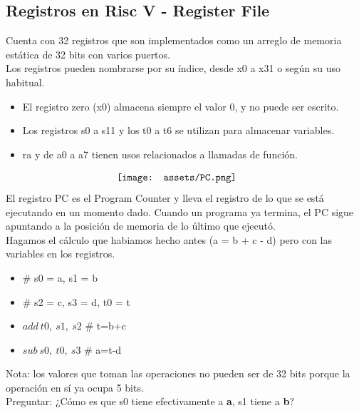 \documentclass[10pt,a4paper]{article}
\begin{document}
\subsection*{Registros en Risc V - Register File}
Cuenta con 32 registros que son implementados como un arreglo de memoria estática de 32 bits con varios puertos. \\
Los registros pueden nombrarse por su índice, desde x0 a x31 o según su uso habitual.
\begin{itemize}
    \item El registro zero (x0) almacena siempre el valor 0, y no puede ser escrito.
    \item Los registros s0 a s11 y los t0 a t6 se utilizan para almacenar variables.
    \item ra y de a0 a a7 tienen usos relacionados a llamadas de función.
\end{itemize}
\[\begin{minipage}[b]{0.4\textwidth}
    \texttt{[image: assets/PC.png]}
    \label{fig:PC}
\end{minipage}\]
El registro PC es el Program Counter y lleva el registro de lo que se está ejecutando en un momento dado. Cuando un programa ya termina, el PC sigue apuntando a la posición de memoria de lo último que ejecutó. \\
Hagamos el cálculo que habiamos hecho antes (a = b + c - d) pero con las variables en los registros.
\begin{itemize}
    \item \# s0 = a, s1 = b
    \item \# s2 = c, s3 = d, t0 = t
    \item \(add \ t0,\ s1,\ s2\) \# t=b+c
    \item \(sub \ s0,\ t0, \ s3\) \# a=t-d
\end{itemize}
Nota: los valores que toman las operaciones no pueden ser de 32 bits porque la operación en sí ya ocupa 5 bits. \\
Preguntar: ¿Cómo es que s0 tiene efectivamente a \textbf{a}, s1 tiene a \textbf{b}?
\end{document}
